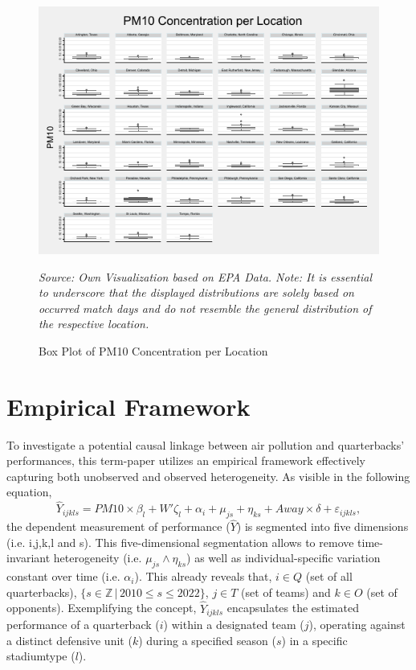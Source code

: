 \documentclass[12pt,a4paper]{article}
\begin{document}
\begin{figure}[h]
	\center
	\includegraphics[scale=1.7]{../05_Figures/PM10_Concentration_per_Place.pdf}
	\caption*{\footnotesize \textit{Source: Own Visualization based on EPA Data. Note: It is essential to underscore that the displayed distributions are solely based on occurred match days and do not resemble the general distribution of the respective location.}}
	\caption{Box Plot of PM10 Concentration per Location}
	\label{F:1}
\end{figure}
\clearpage
\section{Empirical Framework}
To investigate a potential causal linkage between air pollution and quarterbacks' performances, this term-paper utilizes an empirical framework effectively capturing both unobserved and observed heterogeneity. As visible in the following equation,
\begin{equation}
\hat{Y}_{ijkls} = PM10 \times \beta_l + {W'} \zeta_l + \alpha_i + \mu_{js} + \eta_{ks} + Away \times \delta + \varepsilon_{ijkls},
\end{equation}
the dependent measurement of performance ($\hat{Y}$) is segmented into five dimensions (i.e. i,j,k,l and s). This five-dimensional segmentation allows to remove time-invariant heterogeneity (i.e. $ \mu_{js} \wedge \eta_{ks}$) as well as individual-specific variation constant over time (i.e. $\alpha_i$). This already reveals that, $i \in Q$ (set of all quarterbacks), $\{s \in \mathbb{Z} \, | \, 2010 \leq s \leq 2022\}$, $j \in T$ (set of teams) and $k \in O$ (set of opponents). Exemplifying the concept, $\hat{Y}_{ijkls}$ encapsulates the estimated performance of a quarterback ($i$) within a designated team ($j$), operating against a distinct defensive unit ($k$) during a specified season ($s$) in a specific stadiumtype ($l$). 
\end{document}
